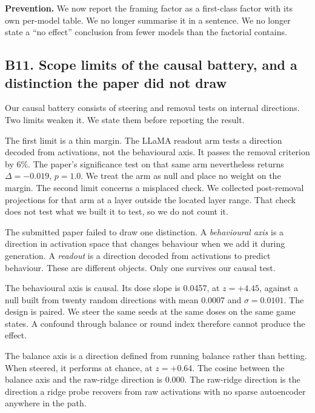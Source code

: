 \textbf{Prevention.} We now report the framing factor as a first-class factor with its own
per-model table. We no longer summarise it in a sentence. We no longer state a ``no effect''
conclusion from fewer models than the factorial contains.


\subsection*{B11. Scope limits of the causal battery, and a distinction the paper did not draw}

Our causal battery consists of steering and removal tests on internal directions. Two limits weaken
it. We state them before reporting the result.

The first limit is a thin margin. The LLaMA readout arm tests a direction decoded from activations,
not the behavioural axis. It passes the removal criterion by 6\%. The paper's significance test
on that same arm nevertheless returns $\Delta = -0.019$, $p = 1.0$. We treat the arm as null and
place no weight on the margin. The second limit concerns a
misplaced check. We collected post-removal projections for that arm at a layer outside the located
layer range. That check does not test what we built it to test, so we do not count it.

The submitted paper failed to draw one distinction. A \emph{behavioural axis} is a direction in
activation space that changes behaviour when we add it during generation. A \emph{readout} is a
direction decoded from activations to predict behaviour. These are different objects. Only one
survives our causal test.

The behavioural axis is causal. Its dose slope is 0.0457, at $z = +4.45$, against a null built
from twenty random directions with mean 0.0007 and $\sigma = 0.0101$. The design is paired. We
steer the same seeds at the same doses on the same game states. A confound through balance or
round index therefore cannot produce the effect.

The balance axis is a direction defined from running balance rather than betting. When steered, it
performs at chance, at $z = +0.64$. The cosine between the balance axis and the raw-ridge
direction is 0.000. The raw-ridge direction is the direction a ridge probe recovers from raw
activations with no sparse autoencoder anywhere in the path.

